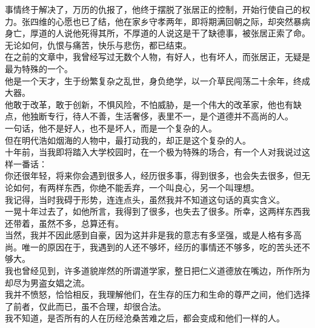 \begin{multicols}{\theparacolNo}
事情终于解决了，万历的仇报了，他终于摆脱了张居正的控制，开始行使自己的权力。张四维的心愿也已了结，他在家乡守孝两年，即将期满回朝之际，却突然暴病身亡，厚道的人说他死得其所，不厚道的人说这是干了缺德事，被张居正索了命。\\

无论如何，仇恨与痛苦，快乐与悲伤，都已结束。\\

在之前的文章中，我曾经写过无数个人物，有好人，也有坏人，而张居正，无疑是最为特殊的一个。\\

他是一个天才，生于纷繁复杂之乱世，身负绝学，以一介草民闯荡二十余年，终成大器。\\

他敢于改革，敢于创新，不惧风险，不怕威胁，是一个伟大的改革家，他也有缺点，他独断专行，待人不善，生活奢侈，表里不一，是个道德并不高尚的人。\\

一句话，他不是好人，也不是坏人，而是一个复杂的人。\\

但在明代浩如烟海的人物中，最打动我的，却正是这个复杂的人。\\

十年前，当我即将踏入大学校园时，在一个极为特殊的场合，有一个人对我说过这样一番话：\\

你还很年轻，将来你会遇到很多人，经历很多事，得到很多，也会失去很多，但无论如何，有两样东西，你绝不能丢弃，一个叫良心，另一个叫理想。\\

我记得，当时我碍于形势，连连点头，虽然我并不知道这句话的真实含义。\\

一晃十年过去了，如他所言，我得到了很多，也失去了很多。所幸，这两样东西我还带着，虽然不多，总算还有。\\

当然，我并不因此感到自豪，因为这并非是我的意志有多坚强，或是人格有多高尚。唯一的原因在于，我遇到的人还不够坏，经历的事情还不够多，吃的苦头还不够大。\\

我也曾经见到，许多道貌岸然的所谓道学家，整日把仁义道德放在嘴边，所作所为却尽为男盗女娼之流。\\

我并不愤怒，恰恰相反，我理解他们，在生存的压力和生命的尊严之间，他们选择了前者，仅此而已，虽不合理，却很合法。\\

我不知道，是否所有的人在历经沧桑苦难之后，都会变成和他们一样的人。\\


\end{multicols}
